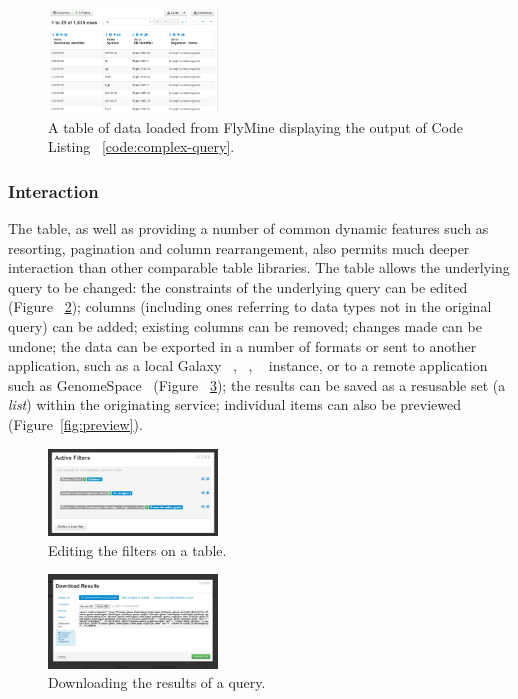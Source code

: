 \documentclass[10pt,a4paper,twocolumn]{article}
\begin{document}
\begin{figure}
\centering
\includegraphics[width=0.4\textwidth]{imtable-complex.png}
\caption{
    \label{fig:complex}
    A table of data loaded from FlyMine displaying the output of Code Listing
    ~\ref{code:complex-query}.
}
\end{figure}

\subsubsection*{Interaction}

The table, as well as providing a number of common dynamic features such as
resorting, pagination and column rearrangement, also permits much deeper
interaction than other comparable table libraries. The table allows the
underlying query to be changed: the constraints of the underlying query can be
edited (Figure ~\ref{fig:edit-filters}); columns (including ones referring to
data types not in the original query) can be added; existing columns can be
removed; changes made can be undone; the data can be exported in a number of
formats or sent to another application, such as a local Galaxy
~\cite{goecks2010galaxy}, ~\cite{blankenberg2010galaxy},
~\cite{giardine2005galaxy} instance, or to a remote application such as
GenomeSpace~\cite{genomespace} (Figure ~\ref{fig:export}); the results can be
saved as a resusable set (a \emph{list}) within the originating service;
individual items can also be previewed (Figure~\ref{fig:preview}).

\begin{figure}[htb]
\centering
\includegraphics[width=0.4\textwidth]{table-edit-filters.png}
\caption{\label{fig:edit-filters} Editing the filters on a table.}
\end{figure}

\begin{figure}[htb]
\centering
\includegraphics[width=0.4\textwidth]{table-download.png}
\caption{\label{fig:export} Downloading the results of a query.}
\end{figure}
\end{document}

